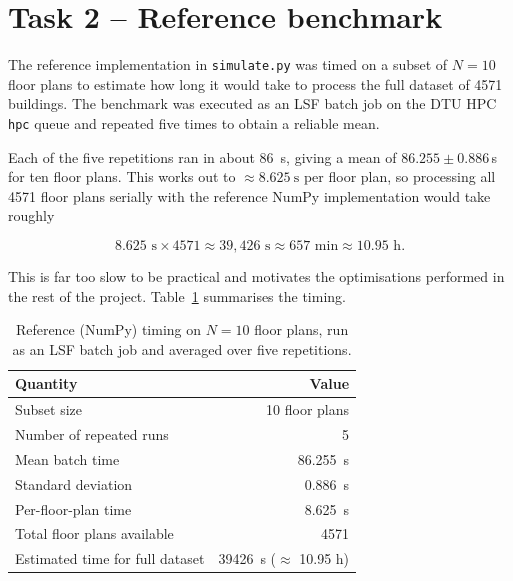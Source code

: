 \documentclass[11pt,a4paper]{article}
\begin{document}
\section{Task 2 -- Reference benchmark}

The reference implementation in \texttt{simulate.py} was timed on a subset of
\(N = 10\) floor plans to estimate how long it would take to process the full
dataset of 4571 buildings. The benchmark was executed as an LSF batch job on the
DTU HPC \texttt{hpc} queue and repeated five times to obtain a reliable mean.

Each of the five repetitions ran in about \SI{86}{\second}, giving a mean of
\(86.255 \pm 0.886\)\,s for ten floor plans. This works out to
\(\approx \SI{8.625}{\second}\) per floor plan, so processing all 4571 floor
plans serially with the reference NumPy implementation would take roughly

\[
    8.625 \text{ s} \times 4571 \approx 39{,}426 \text{ s} \approx 657 \text{ min} \approx 10.95 \text{ h}.
\]

This is far too slow to be practical and motivates the optimisations performed
in the rest of the project. Table~\ref{tab:task2-timing} summarises the timing.

\begin{table}[H]
    \centering
    \begin{tabular}{lr}
        \toprule
        Quantity & Value \\
        \midrule
        Subset size & 10 floor plans \\
        Number of repeated runs & 5 \\
        Mean batch time & \SI{86.255}{\second} \\
        Standard deviation & \SI{0.886}{\second} \\
        Per-floor-plan time & \SI{8.625}{\second} \\
        Total floor plans available & 4571 \\
        Estimated time for full dataset & \SI{39426}{\second} ($\approx$ 10.95 h) \\
        \bottomrule
    \end{tabular}
    \caption{Reference (NumPy) timing on \(N = 10\) floor plans, run as an LSF
    batch job and averaged over five repetitions.}
    \label{tab:task2-timing}
\end{table}
\end{document}
